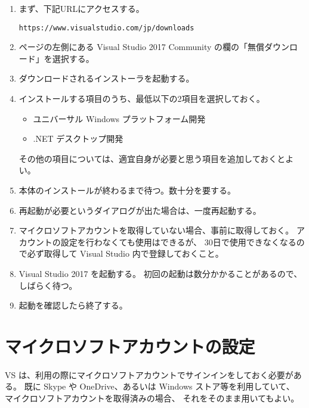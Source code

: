 \documentclass[a4paper]{jsarticle}
\begin{document}
\begin{enumerate}
 \item まず、下記URLにアクセスする。
  \begin{screen}
  \begin{center}
	\verb+https://www.visualstudio.com/jp/downloads+
  \end{center}
  \end{screen}

 \item ページの左側にある Visual Studio 2017 Community の欄の「無償ダウンロード」を選択する。

 \item ダウンロードされるインストーラを起動する。

 \item インストールする項目のうち、最低以下の2項目を選択しておく。
	\begin{itemize}
	 \item ユニバーサル Windows プラットフォーム開発
	 \item .NET デスクトップ開発
	\end{itemize}
	その他の項目については、適宜自身が必要と思う項目を追加しておくとよい。

 \item 本体のインストールが終わるまで待つ。数十分を要する。

 \item 再起動が必要というダイアログが出た場合は、一度再起動する。

 \item マイクロソフトアカウントを取得していない場合、事前に取得しておく。
	アカウントの設定を行わなくても使用はできるが、
	30日で使用できなくなるので必ず取得して Visual Studio 内で登録しておくこと。

 \item Visual Studio 2017 を起動する。
	初回の起動は数分かかることがあるので、しばらく待つ。

 \item 起動を確認したら終了する。

\end{enumerate}

\section{マイクロソフトアカウントの設定}

VS は、利用の際にマイクロソフトアカウントでサインインをしておく必要がある。
既に Skype や OneDrive、あるいは Windows ストア等を利用していて、
マイクロソフトアカウントを取得済みの場合、
それをそのまま用いてもよい。
\end{document}
